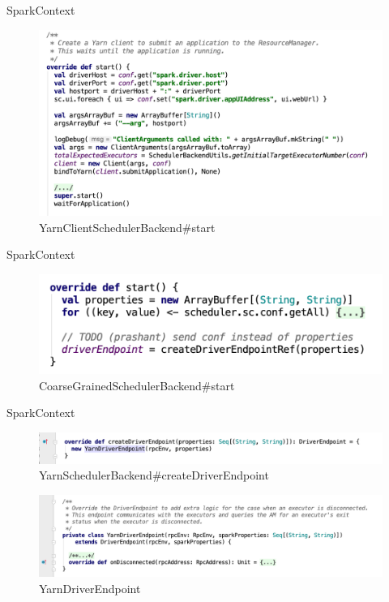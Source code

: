 \begin{frame}[plain,t]{SparkContext} %
	 \\  
	\begin{figure}
		\centering
		\includegraphics[width=0.9\linewidth]{images/init014}
		\caption{YarnClientSchedulerBackend\#start}
		\label{fig:init014}
	\end{figure}
\end{frame}
\begin{frame}[plain,t]{SparkContext} %
	 \\  
	\begin{figure}
		\centering
		\includegraphics[width=0.9\linewidth]{images/init012}
		\caption{CoarseGrainedSchedulerBackend\#start}
		\label{fig:init012}
	\end{figure}
\end{frame}
\begin{frame}[plain,t]{SparkContext} %
	 \\  
	\begin{figure}
		\centering
		\includegraphics[width=0.9\linewidth]{images/yarn001}
		\caption{YarnSchedulerBackend\#createDriverEndpoint}
		\label{fig:yarn001}
	\end{figure}
\begin{figure}
	\centering
	\includegraphics[width=0.9\linewidth]{images/yarn002}
	\caption{YarnDriverEndpoint}
	\label{fig:yarn002}
\end{figure}

\end{frame}
